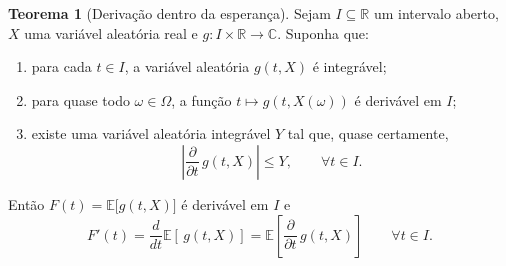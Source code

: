 \documentclass[12pt,portuguese]{article}
\theoremstyle{definition}
\newtheorem{theorem}{Teorema}
\theoremstyle{plainexercise}
\theoremstyle{starredexercise}
\theoremstyle{definition}
\begin{document}
\begin{theorem}[Derivação dentro da esperança]\label{thm:derivacao-integral}
Sejam $I\subseteq\mathbb{R}$ um intervalo aberto, $X$ uma variável aleatória
real e $g:I\times\mathbb{R}\to\mathbb{C}$. Suponha que:
\begin{enumerate}
\item[(i)] para cada $t\in I$, a variável aleatória $g(t,X)$ é integrável;
\item[(ii)] para quase todo $\omega\in\Omega$, a função
$t\mapsto g(t,X(\omega))$ é derivável em $I$;
\item[(iii)] existe uma variável aleatória integrável $Y$ tal que, quase
certamente,
\[
\left| \frac{\partial}{\partial t}\, g(t,X)\right|\leqslant Y,
\qquad \forall t\in I.
\]
\end{enumerate}
Então $F(t)=\mathbb{E}\bigl[g(t,X)\bigr]$ é derivável em $I$ e
\[
F'(t)
=
\frac{d}{dt} \mathbb{E}\left[\, g(t,X)\right]
=
\mathbb{E}\left[ \frac{\partial}{\partial t}\, g(t,X)\right]
\qquad \forall t\in I.
\]
\end{theorem}
\end{document}
